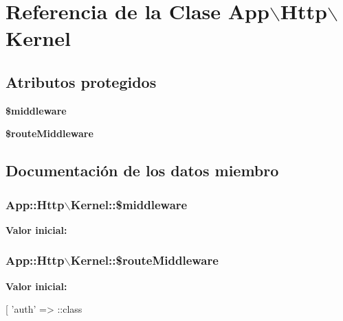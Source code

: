 \hypertarget{class_app_1_1_http_1_1_kernel}{\section{\-Referencia de la \-Clase \-App$\backslash$\-Http$\backslash$\-Kernel}
\label{class_app_1_1_http_1_1_kernel}
}
\subsection*{\-Atributos protegidos}
\begin{DoxyCompactItemize}
\item 
{\bfseries \$middleware}
\item 
{\bfseries \$route\-Middleware}
\end{DoxyCompactItemize}


\subsection{\-Documentación de los datos miembro}
\hypertarget{class_app_1_1_http_1_1_kernel_ad3188d9fd58828db5d6d39dbc82eddd5}{
\subsubsection[{\$middleware}]{\setlength{\rightskip}{0pt plus 5cm}\-App\-::\-Http$\backslash$\-Kernel\-::\$middleware}}\label{class_app_1_1_http_1_1_kernel_ad3188d9fd58828db5d6d39dbc82eddd5}
{\bfseries \-Valor inicial\-:}
\begin{DoxyCode}
\end{DoxyCode}
\hypertarget{class_app_1_1_http_1_1_kernel_af50346cf358a1207baea2d604746050c}{
\subsubsection[{\$route\-Middleware}]{\setlength{\rightskip}{0pt plus 5cm}\-App\-::\-Http$\backslash$\-Kernel\-::\$route\-Middleware}}\label{class_app_1_1_http_1_1_kernel_af50346cf358a1207baea2d604746050c}
{\bfseries \-Valor inicial\-:}
\begin{DoxyCode}
 [
        'auth' => \App\Http\Middleware\Authenticate::class
\end{DoxyCode}


